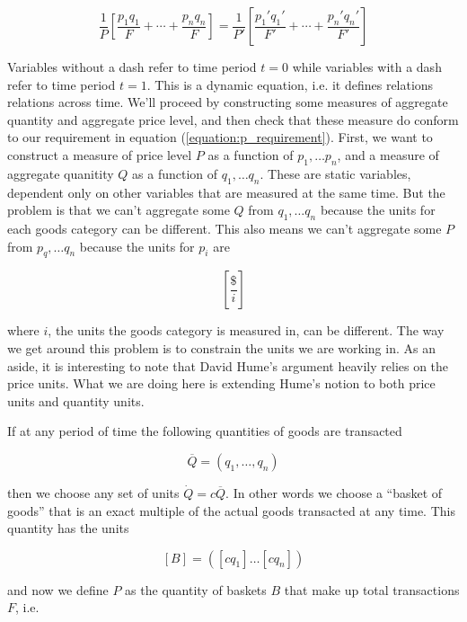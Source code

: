 \begin{equation}\label{equation:p_requirement}
    \frac 1 P \left[ \frac {p_1 q_1} F + \cdots + \frac {p_n q_n} F \right]
    = \frac 1 {P'} \left[ \frac {p_1' q_1'} {F'} + \cdots + \frac {p_n' q_n'} {F'} \right]
\end{equation}

Variables without a dash refer to time period $t=0$ while variables with a dash refer to time period
$t=1$. This is a dynamic equation, i.e. it defines relations relations across time. We'll proceed by
constructing some measures of aggregate quantity and aggregate price level, and then check that
these measure do conform to our requirement in equation (\ref{equation:p_requirement}). First, we
want to construct a measure of price level $P$ as a function of $p_1, \dots p_n$, and a measure of
aggregate quanitity $Q$ as a function of $q_1, \dots q_n$. These are static variables, dependent
only on other variables that are measured at the same time. But the problem is that we can't
aggregate some $Q$ from $q_1, \dots q_n$ because the units for each goods category can be different.
This also means we can't aggregate some $P$ from $p_q, \dots q_n$ because the units for $p_i$ are

\[
    \left[ \frac {\$} {i} \right]  
\]

where $i$, the units the goods category is measured in, can be different. The way we get around this
problem is to constrain the units we are working in. As an aside, it is interesting to note that
David Hume's argument heavily relies on the price units.  What we are doing here is extending Hume's
notion to both price units and quantity units. 

If at any period of time the following quantities of goods are transacted

\[
    \overline Q = \left( q_1, \dots ,q_n \right)
\]

then we choose any set of units $ \dot Q = c \overline Q $. In other words we choose a ``basket of
goods'' that is an exact multiple of the actual goods transacted at any time. This quantity has the
units

\begin{equation}\label{equation:basket}
    \left[ B \right] = \left( \left[ c q_1 \right] \dots \left[ c q_n \right] \right)
\end{equation}

and now we define $P$ as the quantity of baskets $B$ that make up total transactions $F$, i.e.  

